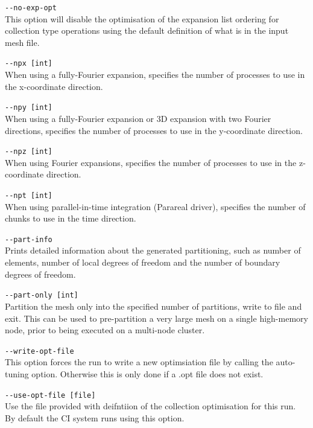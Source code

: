 \lstinline[style=BashInputStyle]{--no-exp-opt}\\
\hangindent=1.5cm
This option will disable the optimisation of the expansion list ordering for collection type operations using the default definition of what is in the input mesh file. 

\lstinline[style=BashInputStyle]{--npx [int]}\\
\hangindent=1.5cm
When using a fully-Fourier expansion, specifies the number of processes to use in the x-coordinate direction.

\lstinline[style=BashInputStyle]{--npy [int]}\\
\hangindent=1.5cm
\quad When using a fully-Fourier expansion or 3D expansion with two Fourier directions, specifies the number of processes to use in the y-coordinate direction.

\lstinline[style=BashInputStyle]{--npz [int]}\\
\hangindent=1.5cm
When using Fourier expansions, specifies the number of processes to use in the z-coordinate direction.

\lstinline[style=BashInputStyle]{--npt [int]}\\
\hangindent=1.5cm
When using parallel-in-time integration (Parareal driver), specifies the number of chunks to use in the time direction.

\lstinline[style=BashInputStyle]{--part-info}\\
\hangindent=1.5cm
Prints detailed information about the generated partitioning, such as number of
elements, number of local degrees of freedom and the number of boundary degrees
of freedom.

\lstinline[style=BashInputStyle]{--part-only [int]}\\
\hangindent=1.5cm
Partition the mesh only into the specified number of partitions, write to file
and exit. This can be used to pre-partition a very large mesh on a single
high-memory node, prior to being executed on a multi-node cluster.


\lstinline[style=BashInputStyle]{--write-opt-file}\\
\hangindent=1.5cm
This option forces the run to write a new optimsiation file by calling
the auto-tuning option. Otherwise this is only done if a .opt file
does not exist.

\lstinline[style=BashInputStyle]{--use-opt-file [file]}\\
\hangindent=1.5cm
Use the file provided with deifntiion of the collection optimisation
for this run. By default the CI system runs using this option.

